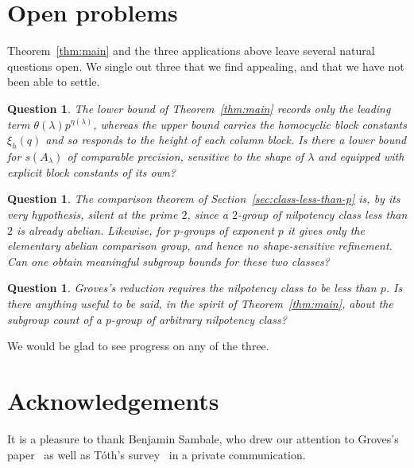 \documentclass[a4paper,11pt,reqno]{amsart}
\theoremstyle{plain}
\newtheorem{question}[theorem]{Question}
\theoremstyle{remark}
\numberwithin{equation}{section}
\begin{document}
\section{Open problems}
\label{sec:open-problems}

Theorem~\ref{thm:main} and the three applications above leave several natural
questions open. We single out three that we find appealing, and that we have
not been able to settle.

\begin{question}\label{q:lower-bound}
The lower bound of Theorem~\ref{thm:main} records only the leading term
$\theta(\lambda)p^{\eta(\lambda)}$, whereas the upper bound carries the
homocyclic block constants $\xi_h(q)$ and so responds to the height of each
column block. Is there a lower bound for $s(A_\lambda)$ of comparable
precision, sensitive to the shape of $\lambda$ and equipped with explicit
block constants of its own?
\end{question}

\begin{question}\label{q:small-prime}
The comparison theorem of Section~\ref{sec:class-less-than-p} is, by its very
hypothesis, silent at the prime $2$, since a $2$-group of nilpotency class
less than $2$ is already abelian. Likewise, for $p$-groups of exponent $p$ it
gives only the elementary abelian comparison group, and hence no shape-sensitive
refinement. Can one obtain meaningful subgroup bounds for these two classes?
\end{question}

\begin{question}\label{q:arbitrary-class}
Groves's reduction requires the nilpotency class to be less than $p$. Is
there anything useful to be said, in the spirit of Theorem~\ref{thm:main},
about the subgroup count of a $p$-group of arbitrary nilpotency class?
\end{question}

We would be glad to see progress on any of the three.

\section*{Acknowledgements}

It is a pleasure to thank Benjamin Sambale, who drew our attention to
Groves's paper~\cite{Groves} as well as T\'oth's survey~\cite{TothSurvey} in a private communication.
\end{document}
